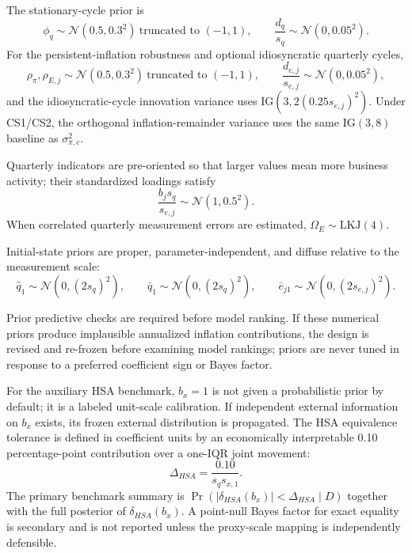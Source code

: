 \documentclass[11pt]{article}
\newcommand{\Normal}{\mathcal{N}}
\begin{document}
The stationary-cycle prior is
\begin{equation}
\phi_q\sim\Normal(0.5,0.3^2)\ \text{truncated to }(-1,1),
\qquad
\frac{d_q}{s_q}\sim\Normal(0,0.05^2).
\end{equation}
For the persistent-inflation robustness and optional idiosyncratic quarterly cycles,
\begin{equation}
\rho_\pi,\rho_{E,j}\sim\Normal(0.5,0.3^2)\ \text{truncated to }(-1,1),
\qquad
\frac{d_{e,j}}{s_{e,j}}\sim\Normal(0,0.05^2),
\end{equation}
and the idiosyncratic-cycle innovation variance uses $\mathrm{IG}(3,2(0.25s_{e,j})^2)$. Under CS1/CS2, the orthogonal inflation-remainder variance uses the same $\mathrm{IG}(3,8)$ baseline as $\sigma_{\pi,c}^2$.

Quarterly indicators are pre-oriented so that larger values mean more business activity; their standardized loadings satisfy
\begin{equation}
\frac{b_js_q}{s_{e,j}}\sim\Normal(1,0.5^2).
\end{equation}
When correlated quarterly measurement errors are estimated, $\Omega_E\sim\mathrm{LKJ}(4)$.

Initial-state priors are proper, parameter-independent, and diffuse relative to the measurement scale:
\begin{equation}
\hat q_1\sim\Normal(0,(2s_q)^2),
\qquad
\bar q_1\sim\Normal(0,(2s_q)^2),
\qquad
\bar e_{j1}\sim\Normal(0,(2s_{e,j})^2).
\end{equation}

Prior predictive checks are required before model ranking. If these numerical priors produce implausible annualized inflation contributions, the design is revised and re-frozen before examining model rankings; priors are never tuned in response to a preferred coefficient sign or Bayes factor.

For the auxiliary HSA benchmark, $b_x=1$ is not given a probabilistic prior by default; it is a labeled unit-scale calibration. If independent external information on $b_x$ exists, its frozen external distribution is propagated. The HSA equivalence tolerance is defined in coefficient units by an economically interpretable 0.10 percentage-point contribution over a one-IQR joint movement:
\begin{equation}
\Delta_{HSA}=\frac{0.10}{s_qs_{x,1}}.
\label{eq:hsa_equivalence_band}
\end{equation}
The primary benchmark summary is $\Pr(|\delta_{HSA}(b_x)|<\Delta_{HSA}\mid D)$ together with the full posterior of $\delta_{HSA}(b_x)$. A point-null Bayes factor for exact equality is secondary and is not reported unless the proxy-scale mapping is independently defensible.
\end{document}
